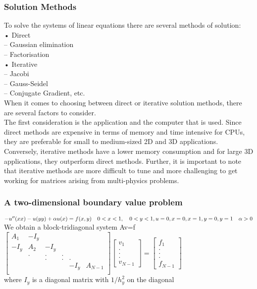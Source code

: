 	\subsubsection{Solution Methods} 
To solve the systems of linear equations there are several methods of solution:\\
• Direct\\
– Gaussian elimination \\
– Factorisation\\
• Iterative\\
– Jacobi\\
– Gauss-Seidel\\
– Conjugate Gradient, etc.\\
When it comes to choosing between direct or iterative solution methods, there are several factors to consider.\\
The first consideration is the application and the computer that is used. Since direct methods are expensive in terms of memory and time intensive for CPUs, they are preferable for small to medium-sized 2D and 3D applications. Conversely, iterative methods have a lower memory consumption and for large 3D applications, they outperform direct methods. Further, it is important to note that iterative methods are more difficult to tune and more challenging to get working for matrices arising from multi-physics problems. 
\subsubsection{A two-dimensional boundary value problem}
$-u''(xx) - u(yy) + \alpha u(x) = f(x,y)  \quad 0<x<1, \quad 0<y<1,\\
u = 0 , x = 0, x = 1, y = 0, y = 1 \quad  \alpha > 0$ \\ 
We obtain a block-tridiagonal system Av=f\\
$
	\begin{bmatrix}
		A_1 & -I_y & & & &\\
		-I_y & A_2 & -I_y & & &\\
		&. & . & . & & \\
		& &. & . & . &   \\
		 & &  & & -I_y &A_{N-1}\\
	\end{bmatrix}
	\begin{bmatrix}
		v_1\\
		.\\
		.\\
		.\\
		v_{N-1}
	\end{bmatrix} = 
	\begin{bmatrix}
		f_1\\
		.\\
		.\\
		.\\
		f_{N-1}
	\end{bmatrix}$\\
	where $I_y$ is a diagonal matrix with $1/h^2_y$ on the diagonal\\
	
